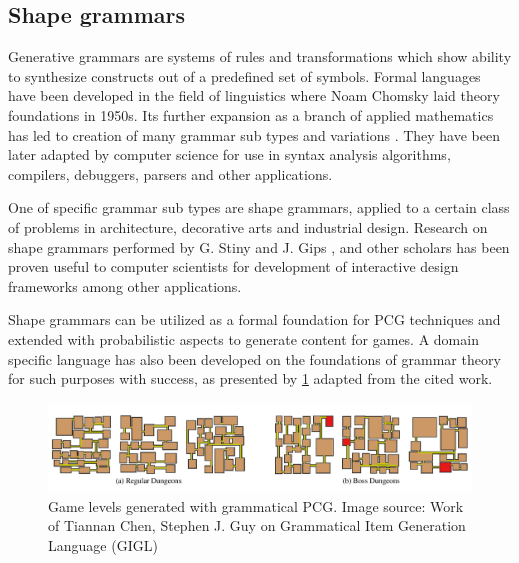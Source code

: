 \documentclass[12pt]{report}
\begin{document}
\subsection{Shape grammars}

Generative grammars are systems of rules and transformations which show ability to synthesize constructs out of a predefined set of symbols. Formal languages have been developed in the field of linguistics where Noam Chomsky laid theory foundations in 1950s. Its further expansion as a branch of applied mathematics has led to creation of many grammar sub types and variations \autocite{Harrison:1978:IFL:578595}. They have been later adapted by computer science for use in syntax analysis algorithms, compilers, debuggers, parsers and other applications. 

One of specific grammar sub types are shape grammars, applied to a certain class of problems in architecture, decorative arts and industrial design. Research on shape grammars performed by G. Stiny and J. Gips \autocite{Stiny1980IntroductionTS}, \autocite{stiny1971shape} and other scholars has been proven useful to computer scientists for development of interactive design frameworks \autocite{Dang:2015:IDP:2816795.2818069} among other applications. 

Shape grammars can be utilized as a formal foundation for PCG techniques and extended with probabilistic aspects \autocite{sportelli2014} to generate content for games. A domain specific language has also been developed on the foundations of grammar theory \autocite{Chen2018GIGLAD} for such purposes with success, as presented by \cref{fig:gigladomainspecificlanguagefor201904231555971576} adapted from the cited work. 

\begin{figure}[H]
	\centering
	\includegraphics[width=\textwidth]{images/GIGL_A_Domain_Specific_Language_for_2019_04_23_1555971576}
	\caption{Game levels generated with grammatical PCG. Image source: Work of Tiannan Chen, Stephen J. Guy on Grammatical Item Generation Language (GIGL) \autocite{Chen2018GIGLAD} }
	\label{fig:gigladomainspecificlanguagefor201904231555971576}
\end{figure}
\end{document}
